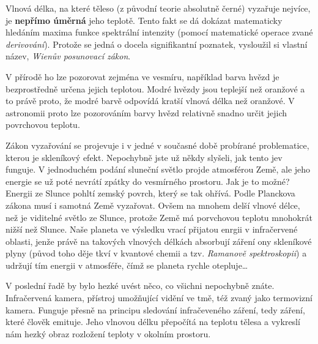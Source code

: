 \documentclass{../../../../style/mkimain}
\begin{document}
\noindent{}
\klein

Vlnová délka, na které těleso (z původní teorie absolutně černé) vyzařuje nejvíce, je \textbf{nepřímo úměrná} jeho teplotě.
Tento fakt se dá dokázat matematicky hledáním maxima funkce spektrální intenzity (pomocí matematické operace zvané \emph{derivování}).
Protože se jedná o docela signifikantní poznatek, vysloužil si vlastní název, \emph{Wienův posunovací zákon}.

V přírodě ho lze pozorovat zejména ve vesmíru, například barva hvězd je bezprostředně určena jejich teplotou.
Modré hvězdy jsou teplejší než oranžové a to právě proto, že modré barvě odpovídá kratší vlnová délka než oranžové.
V astronomii proto lze pozorováním barvy hvězd relativně snadno určit jejich povrchovou teplotu.


Zákon vyzařování se projevuje i v jedné v současné době probírané problematice, kterou je skleníkový efekt.
Nepochybně jste už někdy slyšeli, jak tento jev funguje. V jednoduchém podání sluneční světlo projde atmosférou Země,
ale jeho energie se už poté nevrátí zpátky do vesmírného prostoru. Jak je to možné? Energii ze Slunce pohltí zemský povrch, který se tak ohřívá.
Podle Planckova zákona musí i samotná Země vyzařovat. Ovšem na mnohem delší vlnové délce, než je viditelné světlo ze Slunce,
protože Země má porvchovou teplotu mnohokrát nižší než Slunce. Naše planeta ve výsledku vrací přijatou enrgii v infračervené oblasti,
jenže právě na takových vlnových délkách absorbují záření ony skleníkové plyny
(původ toho děje tkví v kvantové chemii a tzv. \emph{Ramanově spektroskopii}) a udržují tím energii v atmosféře,
čímž se planeta rychle otepluje\dots

V poslední řadě by bylo hezké uvést něco, co všichni nepochybně znáte. Infračervená kamera, přístroj umožňující vidění ve tmě,
též zvaný jako termovizní kamera. Funguje přesně na principu sledování infračeveného záření, tedy záření, které člověk emituje.
Jeho vlnovou délku přepočítá na teplotu tělesa a vykreslí nám hezký obraz rozložení teploty v okolním prostoru.
\end{document}
